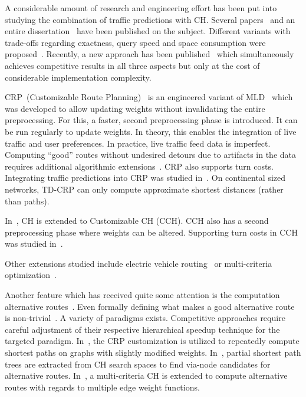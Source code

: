 \documentclass[a4paper,UKenglish,cleveref, autoref, thm-restate]{lipics-v2021}
\begin{document}
A considerable amount of research and engineering effort has been put into studying the combination of traffic predictions with CH.
Several papers~\cite{bdsv-tdch-09,bgns-tdcha-10,klsv-dtdch-10,bgsv-mtdtt-13} and an entire dissertation~\cite{b-tdrpc-14} have been published on the subject.
Different variants with trade-offs regarding exactness, query speed and space consumption were proposed~\cite{bgsv-mtdtt-13}.
Recently, a new approach has been published~\cite{swz-sfert-20} which simultaneously achieves competitive results in all three aspects but only at the cost of considerable implementation complexity.

CRP~(Customizable Route Planning)~\cite{dgpw-crprn-13} is an engineered variant of MLD~\cite{swz-umlgt-02} which was developed to allow updating weights without invalidating the entire preprocessing.
For this, a faster, second preprocessing phase is introduced.
It can be run regularly to update weights.
In theory, this enables the integration of live traffic and user preferences.
In practice, live traffic feed data is imperfect.
Computing ``good'' routes without undesired detours due to artifacts in the data requires additional algorithmic extensions~\cite{dss-tarrn-18}.
CRP also supports turn costs.
Integrating traffic predictions into CRP was studied in~\cite{bdpw-dtdrp-16}.
On continental sized networks, TD-CRP can only compute approximate shortest distances (rather than paths).

In~\cite{dsw-cch-15}, CH is extended to Customizable CH (CCH).
CCH also has a second preprocessing phase where weights can be altered.
Supporting turn costs in CCH was studied in~\cite{bwzz-cchtc-20}.

Other extensions studied include electric vehicle routing~\cite{DBLP:journals/algorithmica/BaumDPSWZ20,DBLP:conf/aaai/EisnerFS11} or multi-criteria optimization~\cite{fns-opca-14,gks-rpfof-10}.

Another feature which has received quite some attention is the computation alternative routes~\cite{bdgs-argrn-11,adgw-arrn-13}.
Even formally defining what makes a good alternative route is non-trivial~\cite{bdgs-argrn-11}.
A variety of paradigms exists.
Competitive approaches require careful adjustment of their respective hierarchical speedup technique for the targeted paradigm.
In~\cite{krs-eepma-13}, the CRP customization is utilized to repeatedly compute shortest paths on graphs with slightly modified weights.
In~\cite{k-hdara-13}, partial shortest path trees are extracted from CH search spaces to find via-node candidates for alternative routes.
In~\cite{barth2019alternative}, a multi-criteria CH is extended to compute alternative routes with regards to multiple edge weight functions.
\end{document}
